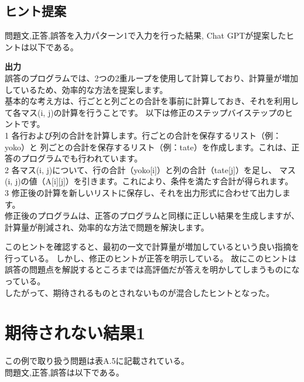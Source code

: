 \subsection{ヒント提案}
問題文,正答,誤答を入力パターン1で入力を行った結果,
Chat GPTが提案したヒントは以下である。
\begin{screen}
\textbf{出力}\\
誤答のプログラムでは、2つの2重ループを使用して計算しており、計算量が増加しているため、効率的な方法を提案します。\\
基本的な考え方は、行ごとと列ごとの合計を事前に計算しておき、それを利用して各マス(i, j)の計算を行うことです。
以下は修正のステップバイステップのヒントです。\\
1 各行および列の合計を計算します。行ごとの合計を保存するリスト（例：yoko）と
列ごとの合計を保存するリスト（例：tate）を作成します。これは、正答のプログラムでも行われています。\\
2 各マス(i, j)について、行の合計（yoko[i]）と列の合計（tate[j]）を足し、
マス(i, j)の値（A[i][j]）を引きます。これにより、条件を満たす合計が得られます。\\
3 修正後の計算を新しいリストに保存し、それを出力形式に合わせて出力します。\\
修正後のプログラムは、正答のプログラムと同様に正しい結果を生成しますが、
計算量が削減され、効率的な方法で問題を解決します。
\end{screen}
このヒントを確認すると、最初の一文で計算量が増加しているという良い指摘を行っている。
しかし、修正のヒントが正答を明示している。
故にこのヒントは誤答の問題点を解説するところまでは高評価だが答えを明かしてしまうものになっている。\\
したがって、期待されるものとされないものが混合したヒントとなった。

\section{期待されない結果1}
この例で取り扱う問題は表A.5に記載されている。\\
問題文,正答,誤答は以下である。
